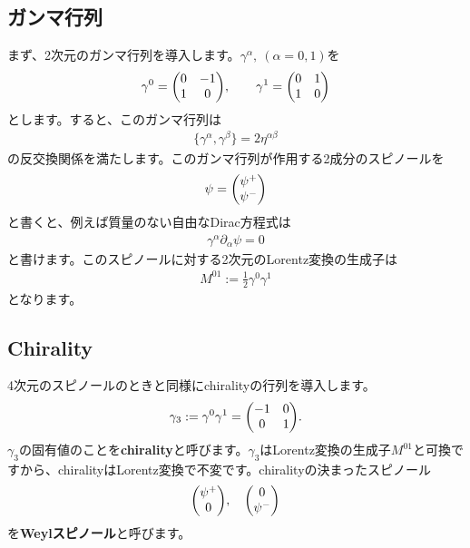 \documentclass[report,paper=a4, fontsize=12pt, line_length=16cm, number_of_lines=34,dvipdfmx]{jlreq}
\numberwithin{equation}{chapter}
\numberwithin{equation}{section}
\newcommand{\del}{\partial}
\newcommand{\kyou}[1]{{\sffamily \bfseries #1}}
\begin{document}
\subsection{ガンマ行列}\label{subsec:gamma}
まず、2次元のガンマ行列を導入します。$\gamma^{\alpha},\ (\alpha=0,1)$を
\begin{align}
  \gamma^{0}=
  \mqty(0 & -1 \\
    1 &0),\qquad
  \gamma^{1}=
  \mqty(0 & 1 \\
    1 &0)
\end{align}
とします。すると、このガンマ行列は
\begin{align}
  \{\gamma^{\alpha},\gamma^{\beta}\}=2\eta^{\alpha\beta}
\end{align}
の反交換関係を満たします。このガンマ行列が作用する2成分のスピノールを
\begin{align}
  \psi=\mqty(\psi^{+}\\ \psi^{-})
\end{align}
と書くと、例えば質量のない自由なDirac方程式は
\begin{align}
  \gamma^{\alpha}\del_{\alpha}\psi=0
\end{align}
と書けます。このスピノールに対する2次元のLorentz変換の生成子は
\begin{align}
  M^{01}:=\frac{1}{2} \gamma^{0}\gamma^{1}
\end{align}
となります。

\subsection{Chirality}
4次元のスピノールのときと同様にchiralityの行列を導入します。
\begin{align}
  \gamma_{3}:=\gamma^{0}\gamma^{1}
  =\mqty(
    -1 & 0 \\
    0 & 1
  ).
\end{align}
$\gamma_3$の固有値のことを\kyou{chirality}と呼びます。$\gamma_3$はLorentz変換の生成子$M^{01}$と可換ですから、chiralityはLorentz変換で不変です。chiralityの決まったスピノール
\begin{align}
  \mqty(\psi^{+}\\ 0),\quad
  \mqty(0 \\ \psi^{-})
\end{align}
を\kyou{Weylスピノール}と呼びます。
\end{document}
